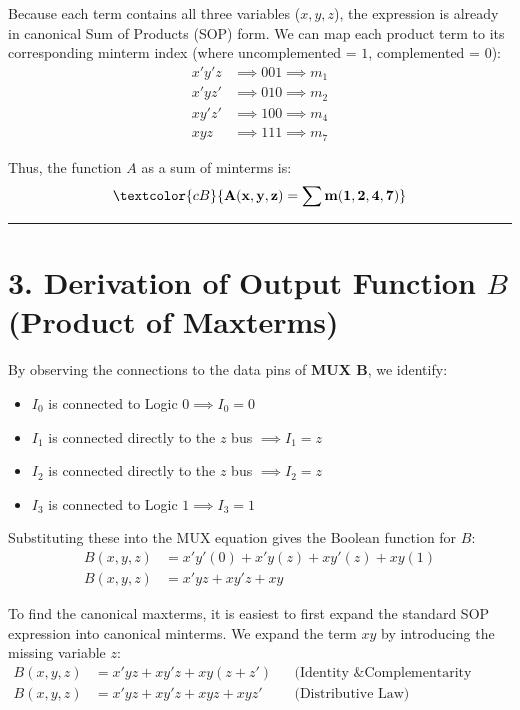 \documentclass[12pt,a3paper]{article}
\begin{document}
\begin{enumerate}
\begin{tcolorbox}[enhanced,breakable,ansbox,colback=cB!4,colframe=cB,boxrule=0.8pt,arc=5pt,title={\textbf{Answer}},fonttitle=\bfseries\color{white},colbacktitle=cB]
Because each term contains all three variables ($x, y, z$), the expression is already in canonical Sum of Products (SOP) form. We can map each product term to its corresponding minterm index (where uncomplemented = $1$, complemented = $0$):
\begin{align*}
    x'y'z  &\implies 001 \implies m_1 \\
    x'yz'  &\implies 010 \implies m_2 \\
    xy'z'  &\implies 100 \implies m_4 \\
    xyz    &\implies 111 \implies m_7
\end{align*}

Thus, the function $A$ as a sum of minterms is:
\begin{equation}
    \textcolor{cB}{\mathbf{A(x, y, z) = \sum m(1, 2, 4, 7)}}
\end{equation}

\vspace{0.2cm}
\hrule
\vspace{0.4cm}

\section*{3. Derivation of Output Function $B$ (Product of Maxterms)}

By observing the connections to the data pins of \textbf{MUX B}, we identify:
\begin{itemize}
    \item $I_0$ is connected to Logic $0 \implies I_0 = 0$
    \item $I_1$ is connected directly to the $z$ bus $\implies I_1 = z$
    \item $I_2$ is connected directly to the $z$ bus $\implies I_2 = z$
    \item $I_3$ is connected to Logic $1 \implies I_3 = 1$
\end{itemize}

Substituting these into the MUX equation gives the Boolean function for $B$:
\begin{align*}
    B(x,y,z) &= x'y'(0) + x'y(z) + xy'(z) + xy(1) \\
    B(x,y,z) &= x'yz + xy'z + xy
\end{align*}

To find the canonical maxterms, it is easiest to first expand the standard SOP expression into canonical minterms. We expand the term $xy$ by introducing the missing variable $z$:
\begin{align*}
    B(x,y,z) &= x'yz + xy'z + xy(z + z') && \text{(Identity \& Complementarity Laws)}\\
    B(x,y,z) &= x'yz + xy'z + xyz + xyz' && \text{(Distributive Law)}
\end{align*}


\end{tcolorbox}
\end{enumerate}
\end{document}

